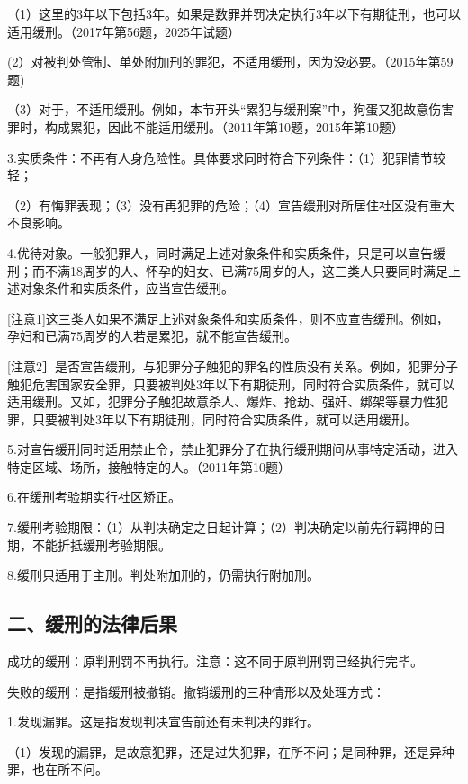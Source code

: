 （1）这里的3年以下包括3年。如果是数罪并罚决定执行3年以下有期徒刑，也可以适用缓刑。（2017年第56题，2025年试题）

(2）对被判处管制、单处附加刑的罪犯，不适用缓刑，因为没必要。（2015年第59题)

（3）对于，不适用缓刑。例如，本节开头“累犯与缓刑案”中，狗蛋又犯故意伤害罪时，构成累犯，因此不能适用缓刑。（2011年第10题，2015年第10题）

3.实质条件：不再有人身危险性。具体要求同时符合下列条件：（1）犯罪情节较轻；

（2）有悔罪表现；（3）没有再犯罪的危险；（4）宣告缓刑对所居住社区没有重大不良影响。

4.优待对象。一般犯罪人，同时满足上述对象条件和实质条件，只是可以宣告缓刑；而不满18周岁的人、怀孕的妇女、已满75周岁的人，这三类人只要同时满足上述对象条件和实质条件，应当宣告缓刑。

[注意1]这三类人如果不满足上述对象条件和实质条件，则不应宣告缓刑。例如，孕妇和已满75周岁的人若是累犯，就不能宣告缓刑。

[注意2］是否宣告缓刑，与犯罪分子触犯的罪名的性质没有关系。例如，犯罪分子触犯危害国家安全罪，只要被判处3年以下有期徒刑，同时符合实质条件，就可以适用缓刑。又如，犯罪分子触犯故意杀人、爆炸、抢劫、强奸、绑架等暴力性犯罪，只要被判处3年以下有期徒刑，同时符合实质条件，就可以适用缓刑。

5.对宣告缓刑同时适用禁止令，禁止犯罪分子在执行缓刑期间从事特定活动，进入特定区域、场所，接触特定的人。（2011年第10题）

6.在缓刑考验期实行社区矫正。

7.缓刑考验期限：（1）从判决确定之日起计算；（2）判决确定以前先行羁押的日期，不能折抵缓刑考验期限。

8.缓刑只适用于主刑。判处附加刑的，仍需执行附加刑。

\subsection*{二、缓刑的法律后果}

成功的缓刑：原判刑罚不再执行。注意：这不同于原判刑罚已经执行完毕。

失败的缓刑：是指缓刑被撤销。撤销缓刑的三种情形以及处理方式：

1.发现漏罪。这是指发现判决宣告前还有未判决的罪行。

（1）发现的漏罪，是故意犯罪，还是过失犯罪，在所不问；是同种罪，还是异种罪，也在所不问。

